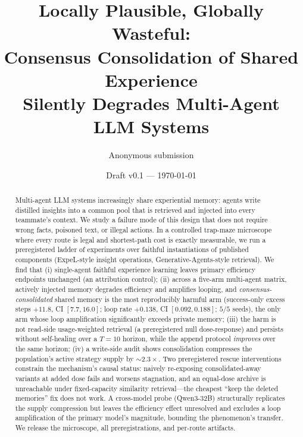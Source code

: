 \documentclass[11pt]{article}
\title{Locally Plausible, Globally Wasteful:\\ Consensus Consolidation of Shared Experience\\ Silently Degrades Multi-Agent LLM Systems}
\author{Anonymous submission}
\date{Draft v0.1 --- \today}
\begin{document}
\maketitle

\begin{center}
\end{center}

\begin{abstract}
Multi-agent LLM systems increasingly share experiential memory: agents write distilled insights
into a common pool that is retrieved and injected into every teammate's context. We study a
failure mode of this design that does not require wrong facts, poisoned text, or illegal
actions. In a controlled trap-maze microscope where every route is legal and shortest-path cost
is exactly measurable, we run a preregistered ladder of experiments over faithful
instantiations of published components (ExpeL-style insight operations, Generative-Agents-style
retrieval). We find that (i) single-agent faithful experience learning leaves primary
efficiency endpoints unchanged (an attribution control); (ii) across a five-arm multi-agent
matrix, actively injected memory degrades efficiency and amplifies looping, and
\emph{consensus-consolidated} shared memory is the most reproducibly harmful arm
(success-only excess steps $+11.8$, CI $[7.7, 16.0]$; loop rate $+0.138$, CI $[0.092, 0.188]$;
$5/5$ seeds), the only arm whose loop amplification significantly exceeds private memory;
(iii) the harm is not read-side usage-weighted retrieval (a preregistered null dose-response)
and persists without self-healing over a $T{=}10$ horizon, while the append protocol
\emph{improves} over the same horizon; (iv) a write-side audit shows consolidation compresses
the population's active strategy supply by ${\sim}2.3\times$. Two preregistered rescue
interventions constrain the mechanism's causal status: naively re-exposing consolidated-away
variants at added dose fails and worsens stagnation, and an equal-dose archive is unreachable
under fixed-capacity similarity retrieval---the cheapest ``keep the deleted memories'' fix does
not work. A cross-model probe (Qwen3-32B) structurally replicates the supply compression but
leaves the efficiency effect unresolved and excludes a loop amplification of the primary
model's magnitude, bounding the phenomenon's transfer. We release the microscope, all
preregistrations, and per-route artifacts.
\end{abstract}
\end{document}
